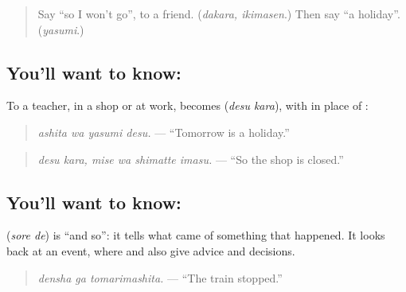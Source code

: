 \begin{quote}
Say \textquotedblleft{}so I won't go\textquotedblright{}, to a friend. (\emph{dakara, ikimasen}.) Then say \textquotedblleft{}a holiday\textquotedblright{}. (\emph{yasumi}.)
\end{quote}

\subsection*{You'll want to know: }
To a teacher, in a shop or at work, \textbf{} becomes \textbf{} (\emph{desu kara}), with \textbf{} in place of \textbf{}:

\begin{quote}
\textbf{ }
\end{quote}

\begin{quote}
\emph{ashita wa yasumi desu.} — \textquotedblleft{}Tomorrow is a holiday.\textquotedblright{}
\end{quote}

\begin{quote}
\textbf{ }
\end{quote}

\begin{quote}
\emph{desu kara, mise wa shimatte imasu.} — \textquotedblleft{}So the shop is closed.\textquotedblright{}
\end{quote}

\subsection*{You'll want to know: }
\textbf{} (\emph{sore de}) is \textquotedblleft{}and so\textquotedblright{}: it tells what came of something that happened. It looks back at an event, where \textbf{} and \textbf{} also give advice and decisions.

\begin{quote}
\textbf{ }
\end{quote}

\begin{quote}
\emph{densha ga tomarimashita.} — \textquotedblleft{}The train stopped.\textquotedblright{}
\end{quote}

\begin{quote}
\textbf{}
\end{quote}


